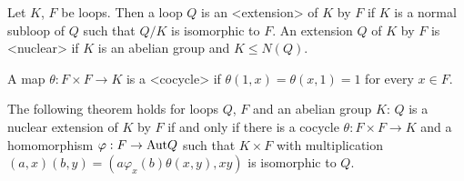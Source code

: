 
Let $K$, $F$ be loops. Then a loop $Q$ is an <extension> of
$K$ by $F$ if $K$ is a normal subloop of $Q$ such that $Q/K$ is isomorphic to
$F$. An extension $Q$ of $K$ by $F$ is <nuclear> if
$K$ is an abelian group and $K\le N(Q)$.

A map $\theta:F\times F\to K$ is a <cocycle> if $\theta(1,x) =
\theta(x,1) = 1$ for every $x\in F$.

The following theorem holds for loops $Q$, $F$ and an abelian group $K$: $Q$ is
a nuclear extension of $K$ by $F$ if and only if there is a cocycle
$\theta:F\times F\to K$ and a homomorphism $\varphi:F\to{\rm{Aut}}{Q}$ such
that $K\times F$ with multiplication $(a,x)(b,y) =
(a\varphi_x(b)\theta(x,y),xy)$ is isomorphic to $Q$.

